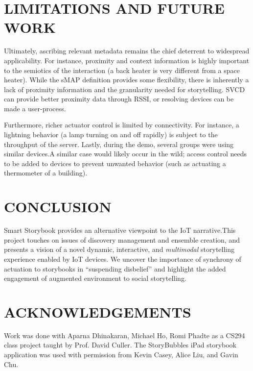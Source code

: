 \documentclass{sigchi}
\begin{document}

\section{LIMITATIONS AND FUTURE WORK}
Ultimately, ascribing relevant metadata remains the chief deterrent to widespread applicability. For instance, proximity and context information is highly important to the semiotics of the interaction (a back heater is very different from a space heater). 
While the sMAP definition provides some flexibility, there is inherently a lack of proximity information and the granularity needed for storytelling. SVCD can provide better proximity data through RSSI, or resolving devices can be made a user-process.

Furthermore, richer actuator control is limited by connectivity. For instance, a lightning behavior (a lamp turning on and off rapidly) is subject to the throughput of the server.
Lastly, during the demo, several groups were using similar devices.A similar case would likely occur in the wild; access control needs to be added to devices to prevent unwanted behavior (such as actuating a thermometer of a building). 

\section{CONCLUSION}
Smart Storybook provides an alternative viewpoint to the IoT narrative.This project touches on issues of discovery management and ensemble creation, and presents a vision of a novel dynamic, interactive, and \textit{multimodal} storytelling experience enabled by IoT devices. We uncover the importance of synchrony of actuation to storybooks in ``suspending disbelief'' and highlight the added engagement of augmented environment to social storytelling. 


\section{ACKNOWLEDGEMENTS}
Work was done with Aparna Dhinakaran, Michael Ho, Romi Phadte as a CS294 class project taught by Prof. David Culler. 
The StoryBubbles iPad storybook application was used with permission from Kevin Casey, Alice Liu, and Gavin Chu. 

\balance


\end{document}
